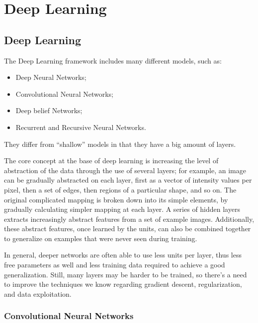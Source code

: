 \chapter{Deep Learning}

\section{Deep Learning}

The Deep Learning framework includes many different models, such as:
\begin{itemize}
    \item Deep Neural Networks;
    \item Convolutional Neural Networks;
    \item Deep belief Networks;
    \item Recurrent and Recursive Neural Networks.
\end{itemize}
They differ from ``shallow'' models in that they have a big amount of layers.

The core concept at the base of deep learning is increasing the level of abstraction of the data through the use of several layers; for example, an image can be gradually abstracted on each layer, first as a vector of intensity values per pixel, then a set of edges, then regions of a particular shape, and so on. The original complicated mapping is broken down into its simple elements, by gradually calculating simpler mapping at each layer. A series of hidden layers extracts increasingly abstract features from a set of example images. Additionally, these abstract features, once learned by the units, can also be combined together to generalize on examples that were never seen during training.

In general, deeper networks are often able to use less units per layer, thus less free parameters as well and less training data required to achieve a good generalization. Still, many layers may be harder to be trained, so there's a need to improve the techniques we know regarding gradient descent, regularization, and data exploitation.

\subsection{Convolutional Neural Networks}

